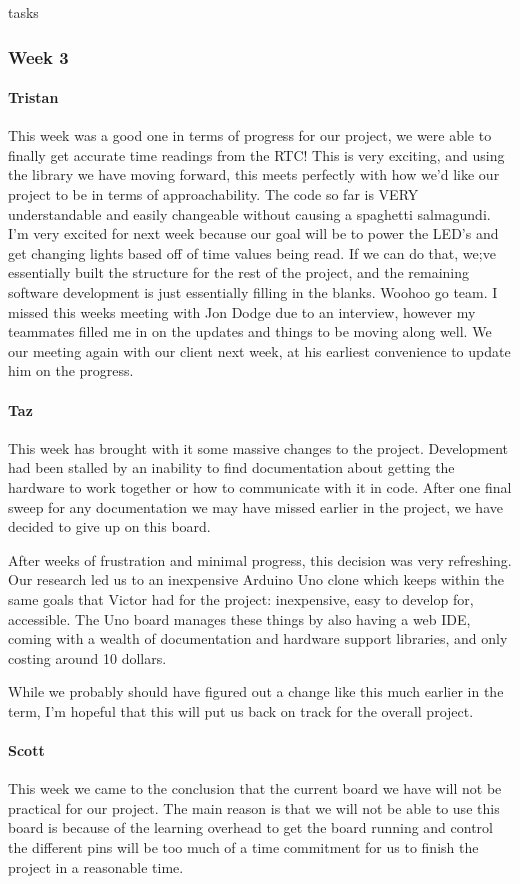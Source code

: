 tasks\documentclass[onecolumn, draftclsnofoot,10pt, compsoc]{IEEEtran}
\begin{document}
\subsubsection{Week 3}
\paragraph{Tristan}
This week was a good one in terms of progress for our project, we were able to finally get accurate time readings from the RTC! This is very exciting, and using the library we have moving forward, this meets perfectly with how we'd like our project to be in terms of approachability. The code so far is VERY understandable and easily changeable without causing a spaghetti salmagundi. I'm very excited for next week because our goal will be to power the LED's and get changing lights based off of time values being read. If we can do that, we;ve essentially built the structure for the rest of the project, and the remaining software development is just essentially filling in the blanks. Woohoo go team. I missed this weeks meeting with Jon Dodge due to an interview, however my teammates filled me in on the updates and things to be moving along well. We our meeting again with our client next week, at his earliest convenience to update him on the progress.
\paragraph{Taz}
This week has brought with it some massive changes to the project. Development had been stalled by an inability to find documentation about getting the hardware to work together or how to communicate with it in code. After one final sweep for any documentation we may have missed earlier in the project, we have decided to give up on this board.

After weeks of frustration and minimal progress, this decision was very refreshing. Our research led us to an inexpensive Arduino Uno clone which keeps within the same goals that Victor had for the project: inexpensive, easy to develop for, accessible. The Uno board manages these things by also having a web IDE, coming with a wealth of documentation and hardware support libraries, and only costing around 10 dollars.

While we probably should have figured out a change like this much earlier in the term, I'm hopeful that this will put us back on track for the overall project.
\paragraph{Scott}
This week we came to the conclusion that the current board we have will not be practical for our project. The main reason is that we will not be able to use this board is because of the learning overhead to get the board running and control the different pins will be too much of a time commitment for us to finish the project in a reasonable time.
\end{document}
